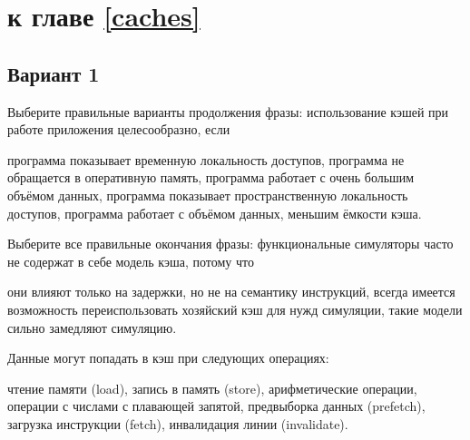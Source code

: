
\section{\Questions к главе \ref{caches}} %

\subsection*{Вариант 1}

\begin{questions}
\question[3] Выберите правильные варианты продолжения фразы: использование кэшей при работе приложения целесообразно, если
\begin{choices}
    \correctchoice    программа показывает временную локальность доступов,
    \choice программа не обращается в оперативную память,
    \choice программа работает с очень большим объёмом данных,
    \correctchoice программа показывает пространственную локальность доступов,
    \choice программа работает с объёмом данных, меньшим ёмкости кэша.
\end{choices}

\question[3] Выберите все правильные окончания фразы: функциональные симуляторы часто не содержат в себе модель кэша, потому что
\begin{choices}
    \correctchoice они влияют только на задержки, но не на семантику инструкций,
    \choice всегда имеется возможность переиспользовать хозяйский кэш для нужд симуляции,
    \correctchoice такие модели сильно замедляют симуляцию.
\end{choices}

\question[3] Данные могут попадать в кэш при следующих операциях:
\begin{choices}
    \correctchoice чтение памяти (load),
    \correctchoice запись в память (store),
    \choice арифметические операции,
    \choice операции с числами с плавающей запятой,
    \correctchoice предвыборка данных (prefetch),
    \correctchoice загрузка инструкции (fetch),
    \choice инвалидация линии (invalidate).
\end{choices}

\end{questions}

